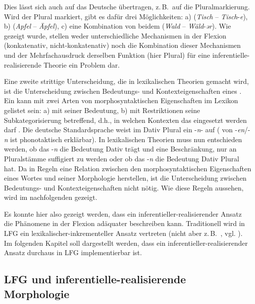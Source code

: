 Dies lässt sich auch auf das Deutsche übertragen, z.\,B.\ auf die Pluralmarkierung. Wird der Plural markiert, gibt es dafür drei Möglichkeiten: a)  (\textit{Tisch} – \mbox{\textit{Tisch}-\textit{e}}), b)  (\textit{Apfel} – \textit{Äpfel}), c) eine Kombination von beidem (\textit{Wald} – \textit{Wäld}-\textit{ər}). Wie gezeigt wurde, stellen weder unterschiedliche Mechanismen in der Flexion (konkatenativ, nicht-konkatenativ) noch die Kombination dieser Mechanismen und der Mehrfachausdruck derselben Funktion (hier Plural) für eine in\-fe\-ren\-tiel\-le-re\-a\-li\-sie\-ren\-de Theorie ein Problem dar.\largerpage

Eine zweite strittige Unterscheidung, die in lexikalischen Theorien gemacht wird, ist die Unterscheidung zwischen Bedeutungs- und Kontexteigenschaften eines . Ein  kann mit zwei Arten von morphosyntaktischen Eigenschaften im Lexikon gelistet sein: a) mit seiner Bedeutung, b) mit Restriktionen seine Subkategorisierung betreffend, d.h., in welchen Kontexten das  eingesetzt werden darf \citep[10]{Stump2001}. Die deutsche Standardsprache weist im Dativ Plural ein -\textit{n}- auf ( von -\textit{en}/-\textit{n} ist phonotaktisch erklärbar). In lexikalischen Theorien muss nun entschieden werden, ob das  -\textit{n} die Bedeutung Dativ trägt und eine Beschränkung, nur an Pluralstämme suffigiert zu werden oder ob das  -\textit{n} die Bedeutung Dativ Plural hat. Da in  Regeln eine Relation zwischen den morphosyntaktischen Eigenschaften eines Wortes und seiner Morphologie herstellen, ist die Unterscheidung zwischen Bedeutungs- und Kontexteigenschaften nicht nötig. Wie diese Regeln aussehen, wird im nachfolgenden  gezeigt.

Es konnte hier also gezeigt werden, dass ein in\-fe\-ren\-tiel\-ler-re\-a\-li\-sie\-ren\-der Ansatz die Phänomene in der Flexion adäquater beschreiben kann. Traditionell wird in LFG ein le\-xi\-ka\-li\-scher-in\-kre\-men\-tel\-ler Ansatz vertreten (nicht aber z.\,B.\ \citealt{ButtNiñoSegond2004}, vgl. ). Im folgenden Kapitel soll dargestellt werden, dass ein in\-fe\-ren\-tiel\-ler-realisierender Ansatz durchaus in LFG implementierbar ist.

\subsection{LFG und inferentielle-realisierende Morphologie}\label{4.1.3}

